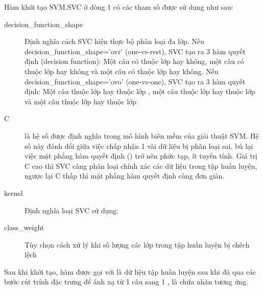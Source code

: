 Hàm khởi tạo SVM.SVC ở dòng 1 có các tham số được sử dụng như sau:
\begin{description}
\item[decision\_function\_shape] Định nghĩa cách SVC hiện thực bộ phân loại đa lớp. Nếu decision\_function\_shape='ovr' (one-vs-rest), SVC tạo ra 3 hàm quyết định (decision function): Một câu có thuộc lớp \tichcuc hay không, một câu có thuộc lớp \tieucuc hay không và một câu có thuộc lớp \trungtinh hay không. Nếu decision\_function\_shape='ovo' (one-vs-one), SVC tạo ra 3 hàm quyết định: Một câu thuộc lớp \tichcuc hay thuộc lớp \tieucuc, một câu thuộc lớp \tieucuc hay thuộc lớp \trungtinh và một câu thuộc lớp \trungtinh hay thuộc lớp \tichcuc
\item[C] là hệ số được định nghĩa trong mô hình biên mềm của giải thuật SVM. Hệ số này đánh đổi giữa việc chấp nhận 1 vài dữ liệu bị phân loại sai, bù lại việc mặt phẳng hàm quyết định () trở nên phức tạp, ít tuyến tính. Giá trị C cao thì SVC càng phân loại chính xác các dữ liệu trong tập huấn luyện, ngược lại C thấp thì mặt phẳng hàm quyết định càng đơn giản.
\item[kernel] Định nghĩa loại  SVC sử dụng: 
\item[class\_weight] Tùy chọn cách xử lý khi số lượng các lớp trong tập huấn luyện bị chêch lệch
\end{description}

Sau khi khởi tạo, hàm  được gọi với  là dữ liệu tập huấn luyện sau khi đã qua các bước rút trính đặc trưng để ánh xạ từ 1 câu sang 1 ,  là  chứa nhãn tương ứng.
